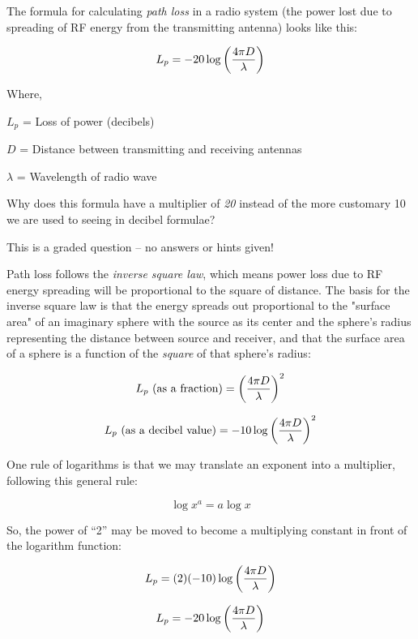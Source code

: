 

The formula for calculating {\it path loss} in a radio system (the power lost due to spreading of RF energy from the transmitting antenna) looks like this:

$$L_p = -20 \log \left({4 \pi D} \over \lambda \right)$$

\noindent
Where,

$L_p$ = Loss of power (decibels)

$D$ = Distance between transmitting and receiving antennas

$\lambda$ = Wavelength of radio wave

\vskip 10pt

Why does this formula have a multiplier of {\it 20} instead of the more customary 10 we are used to seeing in decibel formulae?

\vfil 

\eject






This is a graded question -- no answers or hints given!







Path loss follows the {\it inverse square law}, which means power loss due to RF energy spreading will be proportional to the square of distance.  The basis for the inverse square law is that the energy spreads out proportional to the "surface area" of an imaginary sphere with the source as its center and the sphere's radius representing the distance between source and receiver, and that the surface area of a sphere is a function of the {\it square} of that sphere's radius:

$$L_p \hbox{ (as a fraction)} = \left({4 \pi D} \over \lambda \right)^2$$

$$L_p \hbox{ (as a decibel value)} = -10 \log \left({4 \pi D} \over \lambda \right)^2$$

One rule of logarithms is that we may translate an exponent into a multiplier, following this general rule:

$$\log x^a = a \log x$$

So, the power of ``2'' may be moved to become a multiplying constant in front of the logarithm function:

$$L_p = (2)(-10) \log \left({4 \pi D} \over \lambda \right)$$

$$L_p = -20 \log \left({4 \pi D} \over \lambda \right)$$



